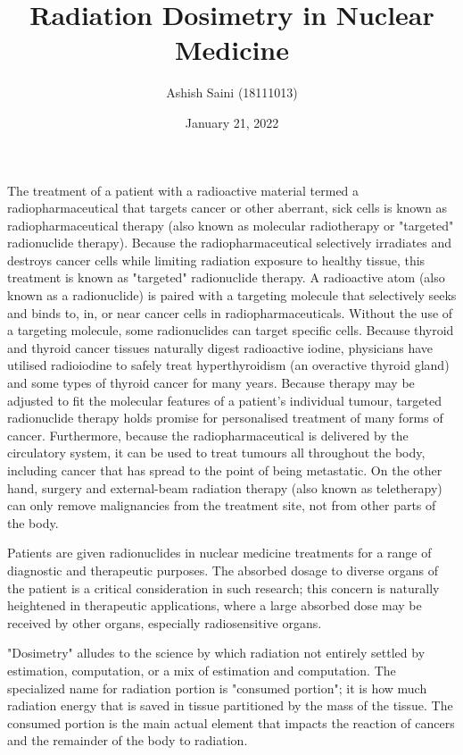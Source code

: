\documentclass[12pt]{article}
\begin{document}
\title{Radiation Dosimetry in Nuclear Medicine}
\author{Ashish Saini (18111013)}
\date{January 21, 2022}
\maketitle




The treatment of a patient with a radioactive material termed a radiopharmaceutical that targets cancer or other aberrant, sick cells is known as radiopharmaceutical therapy (also known as molecular radiotherapy or "targeted" radionuclide therapy). Because the radiopharmaceutical selectively irradiates and destroys cancer cells while limiting radiation exposure to healthy tissue, this treatment is known as "targeted" radionuclide therapy. A radioactive atom (also known as a radionuclide) is paired with a targeting molecule that selectively seeks and binds to, in, or near cancer cells in radiopharmaceuticals. Without the use of a targeting molecule, some radionuclides can target specific cells. Because thyroid and thyroid cancer tissues naturally digest radioactive iodine, physicians have utilised radioiodine to safely treat hyperthyroidism (an overactive thyroid gland) and some types of thyroid cancer for many years. Because therapy may be adjusted to fit the molecular features of a patient's individual tumour, targeted radionuclide therapy holds promise for personalised treatment of many forms of cancer. Furthermore, because the radiopharmaceutical is delivered by the circulatory system, it can be used to treat tumours all throughout the body, including cancer that has spread to the point of being metastatic. On the other hand, surgery and external-beam radiation therapy (also known as teletherapy) can only remove malignancies from the treatment site, not from other parts of the body.
\par
Patients are given radionuclides in nuclear medicine treatments for a range of diagnostic and therapeutic purposes. The absorbed dosage to diverse organs of the patient is a critical consideration in such research; this concern is naturally heightened in therapeutic applications, where a large absorbed dose may be received by other organs, especially radiosensitive organs. 
\par
"Dosimetry" alludes to the science by which radiation not entirely settled by estimation, computation, or a mix of estimation and computation. The specialized name for radiation portion is "consumed portion"; it is how much radiation energy that is saved in tissue partitioned by the mass of the tissue. The consumed portion is the main actual element that impacts the reaction of cancers and the remainder of the body to radiation.
\end{document}
